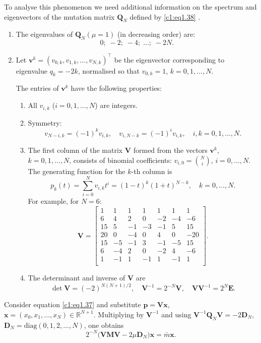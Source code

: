 \documentclass[12pt]{report}
\newcommand{\R}{\mathbb{R}}
\newcommand{\bs}[1]{\bm{#1}}
\theoremstyle{definition}
\theoremstyle{remark}
\begin{document}
To analyse this phenomenon we need additional information on the
spectrum and eigenvectors of the mutation matrix $\bs{Q}_N$
defined by \eqref{c1:eq1.38} \cite{c1:bratus2014_2}.

\begin{enumerate}
\item The eigenvalues of $\bs{Q}_N(\mu=1)$ (in decreasing order) are:
\[
  0;\;-2;\;-4;\;\ldots;\;-2N.
\]

\item Let $\bs{v}^k=(v_{0,k},v_{1,k},\ldots,v_{N,k})^{\top}$ be the
eigenvector corresponding to eigenvalue $q_k=-2k$, normalised so
that $v_{0,k}=1$, $k=0,1,\ldots,N$.

The entries of $\bs{v}^k$ have the following properties:
\begin{enumerate}
\item All $v_{i,k}$ ($i=0,1,\ldots,N$) are integers.

\item Symmetry:
\[
  v_{N-i,k}=(-1)^k v_{i,k},\quad
  v_{i,N-k}=(-1)^i v_{i,k},\quad
  i,k=0,1,\ldots,N.
\]

\item The first column of the matrix $\bs{V}$ formed from the
vectors $\bs{v}^k$, $k=0,1,\ldots,N$, consists of binomial
coefficients: $v_{i,0}=\binom{N}{i}$, $i=0,\ldots,N$.
The generating function for the $k$-th column is
\[
  p_k(t)=\sum_{i=0}^{N}v_{i,k}t^i=(1-t)^k(1+t)^{N-k},\quad
  k=0,\ldots,N.
\]
For example, for $N=6$:
\[
  \bs{V}=
  \begin{bmatrix}
    1 & 1 & 1 & 1 & 1 & 1 & 1\\
    6 & 4 & 2 & 0 & -2 & -4 & -6\\
    15 & 5 & -1 & -3 & -1 & 5 & 15\\
    20 & 0 & -4 & 0 & 4 & 0 & -20\\
    15 & -5 & -1 & 3 & -1 & -5 & 15\\
    6 & -4 & 2 & 0 & -2 & 4 & -6\\
    1 & -1 & 1 & -1 & 1 & -1 & 1\\
  \end{bmatrix}.
\]

\item The determinant and inverse of $\bs{V}$ are
\[
  \det\bs{V}=(-2)^{N(N+1)/2},\quad
  \bs{V}^{-1}=2^{-N}\bs{V},\quad
  \bs{VV}^{-1}=2^N\bs{E}.
\]
\end{enumerate}
\end{enumerate}

Consider equation \eqref{c1:eq1.37} and substitute $\bs{p}=\bs{Vx}$,
$\bs{x}=(x_0,x_1,\ldots,x_N)\in\R^{N+1}$.
Multiplying by $\bs{V}^{-1}$ and using
$\bs{V}^{-1}\bs{Q}_N\bs{V}=-2\bs{D}_N$,
$\bs{D}_N=\mathrm{diag}(0,1,2,\ldots,N)$, one obtains
\begin{equation}
  2^{-N}\bigl(\bs{VMV}-2\mu\bs{D}_N\bigr)\bs{x}=\bar{m}\bs{x}.
  \label{c1:eq1.41}
\end{equation}
\end{document}
